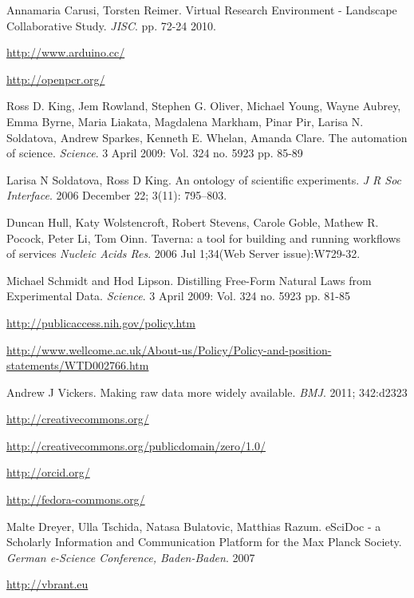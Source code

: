 \documentclass{article}
\begin{document}
\begin{thebibliography}{9}

 Annamaria Carusi, Torsten Reimer. Virtual Research
  Environment - Landscape Collaborative Study. {\em JISC}. pp. 72-24
  2010.

 \url{http://www.arduino.cc/}

 \url{http://openpcr.org/}

 Ross D. King, Jem Rowland, Stephen G. Oliver, Michael
  Young, Wayne Aubrey, Emma Byrne, Maria Liakata, Magdalena Markham,
  Pinar Pir, Larisa N. Soldatova, Andrew Sparkes, Kenneth E. Whelan,
  Amanda Clare. The automation of science. {\em Science}. 3 April 2009:
  Vol. 324 no. 5923 pp. 85-89

 Larisa N Soldatova, Ross D King. An ontology of
  scientific experiments. {\em J R Soc Interface}. 2006 December 22;
  3(11): 795–803.

 Duncan Hull, Katy Wolstencroft, Robert Stevens, Carole
  Goble, Mathew R. Pocock, Peter Li, Tom Oinn.  Taverna: a tool for
  building and running workflows of services {\em Nucleic Acids
    Res}. 2006 Jul 1;34(Web Server issue):W729-32.

 Michael Schmidt and Hod Lipson. Distilling Free-Form
  Natural Laws from Experimental Data. {\em Science}. 3 April 2009:
  Vol. 324 no. 5923 pp. 81-85

 \url{http://publicaccess.nih.gov/policy.htm}

  \url{http://www.wellcome.ac.uk/About-us/Policy/Policy-and-position-statements/WTD002766.htm}

 Andrew J Vickers. Making raw data more widely
  available. {\em BMJ}. 2011; 342:d2323

 \url{http://creativecommons.org/}

 \url{http://creativecommons.org/publicdomain/zero/1.0/}

 \url{http://orcid.org/}

 \url{http://fedora-commons.org/}

 Malte Dreyer, Ulla Tschida, Natasa Bulatovic,
  Matthias Razum. eSciDoc - a Scholarly Information and Communication
  Platform for the Max Planck Society. {\em German e-Science
    Conference, Baden-Baden}. 2007

 \url{http://vbrant.eu}


\end{thebibliography}
\end{document}

